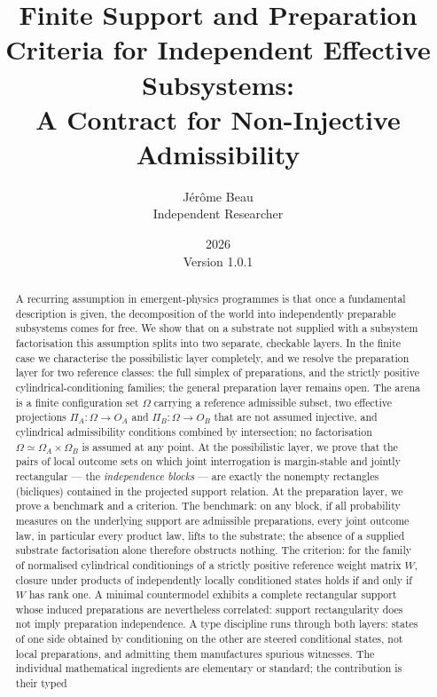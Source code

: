 \documentclass[11pt,a4paper]{article}
\title{Finite Support and Preparation Criteria for Independent Effective Subsystems:\\
A Contract for Non-Injective Admissibility}
\author{J\'{e}r\^{o}me Beau\\
\small Independent Researcher}
\date{2026\\[2pt]\small Version 1.0.1}
\newcommand{\Om}{\Omega}
\newcommand{\OA}{O_A}
\newcommand{\OB}{O_B}
\newcommand{\PiA}{\Pi_A}
\newcommand{\PiB}{\Pi_B}
\begin{document}
  \maketitle

  \begin{abstract}
    A recurring assumption in emergent-physics programmes is that once a fundamental description is given,
    the decomposition of the world into independently preparable subsystems comes for free.
    We show that on a substrate not supplied with a subsystem factorisation this assumption splits into two
    separate, checkable layers.
    In the finite case we characterise the possibilistic layer completely, and we resolve the preparation
    layer for two reference classes: the full simplex of preparations, and the strictly positive
    cylindrical-conditioning families; the general preparation layer remains open.
    The arena is a finite configuration set $\Om$ carrying a reference admissible subset, two effective
    projections $\PiA \colon \Om \to \OA$ and $\PiB \colon \Om \to \OB$ that are not assumed injective, and
    cylindrical admissibility conditions combined by intersection; no factorisation
    $\Om \simeq \Om_A \times \Om_B$ is assumed at any point.
    At the possibilistic layer, we prove that the pairs of local outcome sets on which joint interrogation
    is margin-stable and jointly rectangular --- the \emph{independence blocks} --- are exactly the nonempty
    rectangles (bicliques) contained in the projected support relation.
    At the preparation layer, we prove a benchmark and a criterion.
    The benchmark: on any block, if all probability measures on the underlying support are admissible
    preparations, every joint outcome law, in particular every product law, lifts to the substrate;
    the absence of a supplied substrate factorisation alone therefore obstructs nothing.
    The criterion: for the family of normalised cylindrical conditionings of a strictly positive reference
    weight matrix $W$, closure under products of independently locally conditioned states holds if and only
    if $W$ has rank one.
    A minimal countermodel exhibits a complete rectangular support whose induced preparations are
    nevertheless correlated: support rectangularity does not imply preparation independence.
    A type discipline runs through both layers: states of one side obtained by conditioning on the other are
    steered conditional states, not local preparations, and admitting them manufactures spurious witnesses.
    The individual mathematical ingredients are elementary or standard; the contribution is their typed

\end{abstract}
\end{document}

